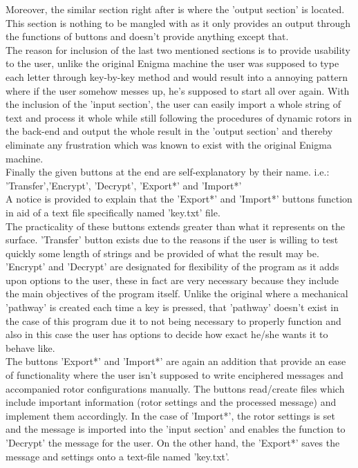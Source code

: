 \documentclass[conference,compsoc]{IEEEtran}
\begin{document}
Moreover, the similar section right after is where the 'output section' is located. This section is nothing to be mangled with as it only provides an output through the functions of buttons and doesn't provide anything except that.\\

The reason for inclusion of the last two mentioned sections is to provide usability to the user, unlike the original Enigma machine the user was supposed to type each letter through key-by-key method and would result into a annoying pattern where if the user somehow messes up, he's supposed to start all over again. With the inclusion of the 'input section', the user can easily import a whole string of text and process it whole while still following the procedures of dynamic rotors in the back-end and output the whole result in the 'output section' and thereby eliminate any frustration which was known to exist with the original Enigma machine.\\

Finally the given buttons at the end are self-explanatory by their name. i.e.: 'Transfer','Encrypt', 'Decrypt', 'Export*' and 'Import*'\\
A notice is provided to explain that the 'Export*' and 'Import*' buttons function in aid of a text file specifically named 'key.txt' file.\\

The practicality of these buttons extends greater than what it represents on the surface. 'Transfer' button exists due to the reasons if the user is willing to test quickly some length of strings and be provided of what the result may be.\\

'Encrypt' and 'Decrypt' are designated for flexibility of the program as it adds upon options to the user, these in fact are very necessary because they include the main objectives of the program itself. Unlike the original where a mechanical 'pathway' is created each time a key is pressed, that 'pathway' doesn't exist in the case of this program due it to not being necessary to properly function and also in this case the user has options to decide how exact he/she wants it to behave like.\\

The buttons 'Export*' and 'Import*' are again an addition that provide an ease of functionality where the user isn't supposed to write enciphered messages and accompanied rotor configurations manually. The buttons read/create files which include important information (rotor settings and the processed message) and implement them accordingly. In the case of 'Import*', the rotor settings is set and the message is imported into the 'input section' and enables the function to 'Decrypt' the message for the user. On the other hand, the 'Export*' saves the message and settings onto a text-file named 'key.txt'.\\
\end{document}

